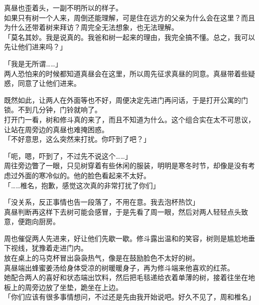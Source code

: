 真昼也歪着头，一副不明所以的样子。\\

如果只有树一个人来，周倒还能理解，可是住在远方的父亲为什么会在这里？而且为什么还带着树来拜访？周完全无法想象，也无法理解。\\

「莫名其妙。我是说真的。我爸和树一起来的理由，我完全搞不懂。总之，我可以先让他们进来吗？」

「我是无所谓……」\\

两人恐怕来的时候都知道真昼会在这里，所以周先征求真昼的同意。真昼带着些疑惑，同意了让他们进来。

既然如此，让两人在外面等也不好，周便决定先进门再问话，于是打开公寓的门锁。不到几分钟，门铃就响了。\\

打开门一看，树和修斗真的来了，而且不知道为什么。这个组合实在太不可思议，让站在周旁边的真昼也难掩困惑。\\

「不好意思，这么突然来打扰。你吓到了吧？」

「呃，嗯，吓到了，不过先不说这个……」\\

周往旁边瞥了一眼，只见树穿着有些休闲的服装，明明是寒冬时节，却像是没有考虑过外面的寒冷似的。他的脸色看起来不太好。\\

「……椎名，抱歉，感觉这次真的非常打扰了你们」

「没关系，反正事情也告一段落了，不用在意。我去泡杯热饮」\\

真昼判断再这样下去树可能会感冒，于是先看了周一眼，然后对两人轻轻点头致意，便跑向厨房。

周也催促两人先进来，好让他们先歇一歇。修斗露出温和的笑容，树则是尴尬地垂下视线，犹豫着走进门内。\\

放在桌上的马克杯冒出袅袅热气，像是在鼓励脸色不太好的树。\\

真昼端出蜂蜜姜汤给身体受凉的树暖暖身子，再为修斗端来他喜欢的红茶。\\

她配合两人的喜好和状态端出饮料，然后把毛毯递给衣着单薄的树，接着往坐在地板上的周旁边放了坐垫，跪坐在上边。\\

「你们应该有很多事情想问，不过还是先由我开始说吧。好久不见了，周和椎名」\\

